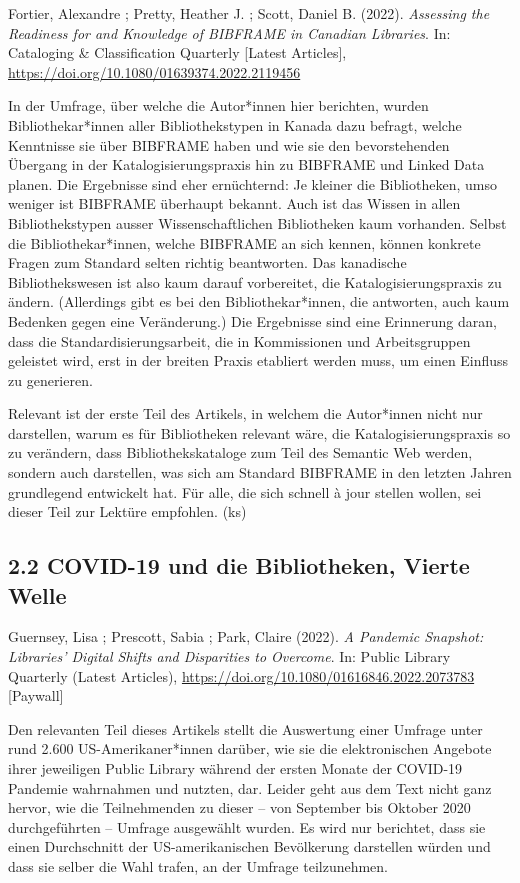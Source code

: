 \documentclass[a4paper,
fontsize=11pt,
oneside,
numbers=noperiodatend,
parskip=half-,
bibliography=totoc,
final
]{scrartcl}
\begin{document}
Fortier, Alexandre ; Pretty, Heather J. ; Scott, Daniel B. (2022).
\emph{Assessing the Readiness for and Knowledge of BIBFRAME in Canadian
Libraries}. In: Cataloging \& Classification Quarterly {[}Latest
Articles{]}, \url{https://doi.org/10.1080/01639374.2022.2119456}

In der Umfrage, über welche die Autor*innen hier berichten, wurden
Bibliothekar*innen aller Bibliothekstypen in Kanada dazu befragt, welche
Kenntnisse sie über BIBFRAME haben und wie sie den bevorstehenden
Übergang in der Katalogisierungspraxis hin zu BIBFRAME und Linked Data
planen. Die Ergebnisse sind eher ernüchternd: Je kleiner die
Bibliotheken, umso weniger ist BIBFRAME überhaupt bekannt. Auch ist das
Wissen in allen Bibliothekstypen ausser Wissenschaftlichen Bibliotheken
kaum vorhanden. Selbst die Bibliothekar*innen, welche BIBFRAME an sich
kennen, können konkrete Fragen zum Standard selten richtig beantworten.
Das kanadische Bibliothekswesen ist also kaum darauf vorbereitet, die
Katalogisierungspraxis zu ändern. (Allerdings gibt es bei den
Bibliothekar*innen, die antworten, auch kaum Bedenken gegen eine
Veränderung.) Die Ergebnisse sind eine Erinnerung daran, dass die
Standardisierungsarbeit, die in Kommissionen und Arbeitsgruppen
geleistet wird, erst in der breiten Praxis etabliert werden muss, um
einen Einfluss zu generieren.

Relevant ist der erste Teil des Artikels, in welchem die Autor*innen
nicht nur darstellen, warum es für Bibliotheken relevant wäre, die
Katalogisierungspraxis so zu verändern, dass Bibliothekskataloge zum
Teil des Semantic Web werden, sondern auch darstellen, was sich am
Standard BIBFRAME in den letzten Jahren grundlegend entwickelt hat. Für
alle, die sich schnell à jour stellen wollen, sei dieser Teil zur
Lektüre empfohlen. (ks)

\hypertarget{covid-19-und-die-bibliotheken-vierte-welle}{%
\subsection{2.2 COVID-19 und die Bibliotheken, Vierte
Welle}\label{covid-19-und-die-bibliotheken-vierte-welle}}

Guernsey, Lisa ; Prescott, Sabia ; Park, Claire (2022). \emph{A Pandemic
Snapshot: Libraries' Digital Shifts and Disparities to Overcome}. In:
Public Library Quarterly (Latest Articles),
\url{https://doi.org/10.1080/01616846.2022.2073783} {[}Paywall{]}

Den relevanten Teil dieses Artikels stellt die Auswertung einer Umfrage
unter rund 2.600 US-Amerikaner*innen darüber, wie sie die elektronischen
Angebote ihrer jeweiligen Public Library während der ersten Monate der
COVID-19 Pandemie wahrnahmen und nutzten, dar. Leider geht aus dem Text
nicht ganz hervor, wie die Teilnehmenden zu dieser -- von September bis
Oktober 2020 durchgeführten -- Umfrage ausgewählt wurden. Es wird nur
berichtet, dass sie einen Durchschnitt der US-amerikanischen Bevölkerung
darstellen würden und dass sie selber die Wahl trafen, an der Umfrage
teilzunehmen.
\end{document}
